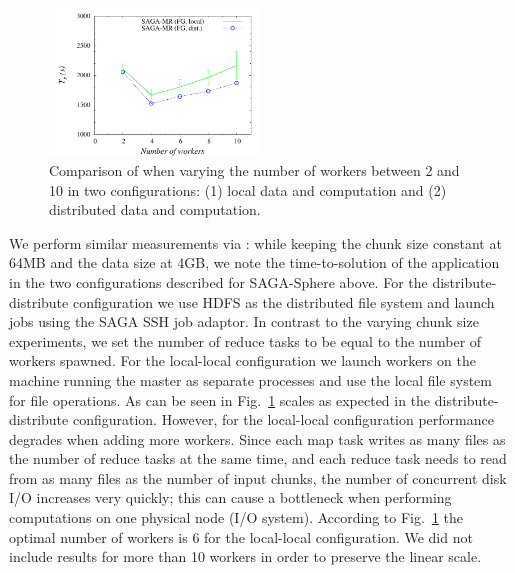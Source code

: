 \documentclass[3p,twocolumn]{elsarticle}
\begin{document}
\begin{figure}[htb!]
 \includegraphics[width=0.5\textwidth]{figures/sagamr_varying_workers.pdf}
 \caption{
   Comparison of \sagamapreduce when varying the number of workers
   between 2 and 10 in two configurations: (1) local data and computation
   and (2) distributed data and computation.
   \label{fig:sagamr_varying_workers}
   }
\end{figure}

We perform similar measurements via \sagamapreduce: while keeping the
chunk size constant at 64MB and the data size at 4GB, we note the
time-to-solution of the \wc application in the two configurations
described for SAGA-Sphere above.  For the distribute-distribute
configuration we use HDFS as the distributed file system and launch
jobs using the SAGA SSH job adaptor.  In contrast to the varying chunk
size experiments, we set the number of reduce tasks to be equal to the
number of workers spawned.   For the local-local configuration we launch
workers on the machine running the master as separate processes and
use the local file system for file operations.  As can be seen in
Fig.~\ref{fig:sagamr_varying_workers} \sagamapreduce scales as
expected in the distribute-distribute configuration.  However, for the
local-local configuration performance degrades when adding more
workers.  Since each map task writes as many files as the number of
reduce tasks at the same time, and each reduce task needs to read from
as many files as the number of input chunks, the number of concurrent
disk I/O increases very quickly; this can cause a
bottleneck when performing computations on one physical node (I/O
system).  According to Fig.~\ref{fig:sagamr_varying_workers} the
optimal number of workers is 6 for the local-local configuration.  We
did not include results for more than 10 workers in order to preserve
the linear
scale. %
\end{document}
